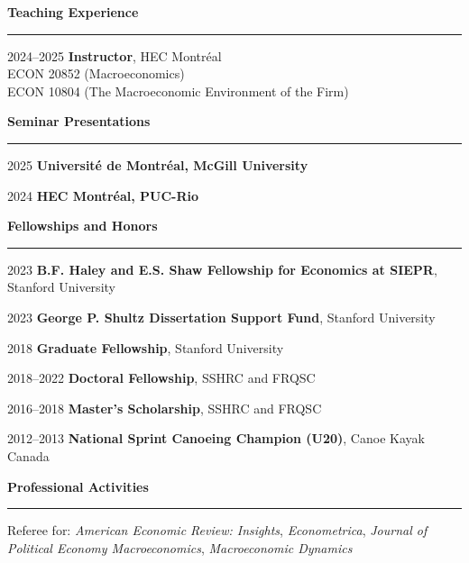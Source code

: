 \documentclass[12pt]{article}
\begin{document}
\vspace{0.5cm}

{\large \textbf{Teaching Experience}} \\
\noindent\rule[0.5\baselineskip]{\textwidth}{1pt}

\begin{small}
2024--2025 \tabto{3cm} \textbf{Instructor}, HEC Montr\'eal \\
\tabto{3cm} \hspace{0.25cm} ECON 20852 (Macroeconomics) \\
\tabto{3cm} \hspace{0.25cm} ECON 10804 (The Macroeconomic Environment of the Firm)
\end{small}

\vspace{0.5cm}

{\large \textbf{Seminar Presentations}} \\
\noindent\rule[0.5\baselineskip]{\textwidth}{1pt}

\begin{small}

2025 \tabto{3cm} \textbf{Universit\'e de Montr\'eal, McGill University}

2024 \tabto{3cm} \textbf{HEC Montr\'eal, PUC-Rio}

\end{small}

\vspace{0.5cm}

{\large \textbf{Fellowships and Honors}} \\
\noindent\rule[0.5\baselineskip]{\textwidth}{1pt}

\begin{small}

2023 \tabto{3cm} \textbf{B.F. Haley and E.S. Shaw Fellowship for Economics at SIEPR}, Stanford University

2023 \tabto{3cm} \textbf{George P. Shultz Dissertation Support Fund}, Stanford University

2018 \tabto{3cm} \textbf{Graduate Fellowship}, Stanford University

2018--2022 \tabto{3cm} \textbf{Doctoral Fellowship}, SSHRC and FRQSC

2016--2018 \tabto{3cm} \textbf{Master's Scholarship}, SSHRC and FRQSC

2012--2013 \tabto{3cm} \textbf{National Sprint Canoeing Champion (U20)}, Canoe Kayak Canada
\end{small}

\vspace{0.5cm}

{\large \textbf{Professional Activities}} \\
\noindent\rule[0.5\baselineskip]{\textwidth}{1pt}

{\small Referee for: \textit{American Economic Review: Insights}, \textit{Econometrica}, \textit{Journal of Political Economy Macroeconomics}, \textit{Macroeconomic Dynamics}}
\end{document}
